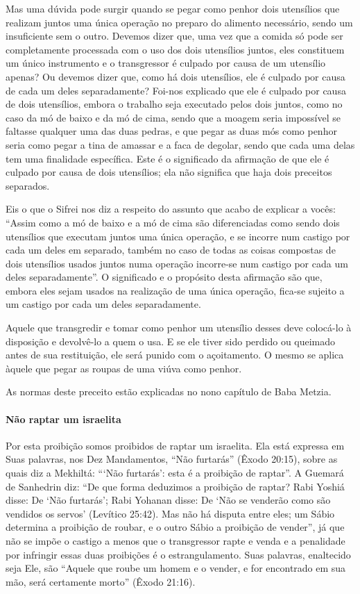 Mas uma dúvida pode surgir quando se pegar como penhor dois utensílios
que realizam juntos uma única operação no preparo do alimento
necessário, sendo um insuficiente sem o outro. Devemos dizer que, uma
vez que a comida só pode ser completamente processada com o uso dos
dois utensílios juntos, eles constituem um único instrumento e o
transgressor é culpado por causa de um utensílio apenas? Ou devemos
dizer que, como há dois utensílios, ele é culpado por causa de cada um
deles separadamente? Foi-nos explicado que ele é culpado por causa de
dois utensílios, embora o trabalho seja executado pelos dois juntos,
como no caso da mó de baixo e da mó de cima, sendo que a moagem seria
impossível se faltasse qualquer uma das duas pedras, e que pegar as
duas mós como penhor seria como pegar a tina de amassar e a faca de
degolar, sendo que cada uma delas tem uma finalidade específica. Este é
o significado da afirmação de que ele é culpado por causa de dois
utensílios; ela não significa que haja dois preceitos separados.

Eis o que o Sifrei nos diz a respeito do assunto que acabo de explicar
a vocês: ``Assim como a mó de baixo e a mó de cima são diferenciadas
como sendo dois utensílios que executam juntos uma única operação, e se
incorre num castigo por cada um deles em separado, também no caso de
todas as coisas compostas de dois utensílios usados juntos numa
operação incorre-se num castigo por cada um deles separadamente''. O
significado e o propósito desta afirmação são que, embora eles sejam
usados na realização de uma única operação, fica-se sujeito a um castigo
por cada um deles separadamente.

Aquele que transgredir e tomar como penhor um utensílio desses deve
colocá-lo à disposição e devolvê-lo a quem o usa. E se ele tiver sido
perdido ou queimado antes de sua restituição, ele será punido com o
açoitamento. O mesmo se aplica àquele que pegar as roupas de uma viúva
como penhor.

As normas deste preceito estão explicadas no nono capítulo de Baba Metzia.

\paragraph{Não raptar um israelita}

Por esta proibição somos proibidos de raptar um israelita. Ela está
expressa em Suas palavras, nos Dez Mandamentos, ``Não furtarás'' (Êxodo
20:15), sobre as quais diz a Mekhiltá: ```Não furtarás': esta é a
proibição de raptar''. A Guemará de Sanhedrin diz: ``De que forma
deduzimos a proibição de raptar? Rabi Yoshiá disse: De `Não furtarás';
Rabi Yohanan disse: De `Não se venderão como são vendidos os servos'
(Levítico 25:42). Mas não há disputa entre eles; um Sábio determina a
proibição de roubar, e o outro Sábio a proibição de vender'', já que
não se impõe o castigo a menos que o transgressor rapte e venda
e a penalidade por infringir essas duas proibições é o estrangulamento.
Suas palavras, enaltecido seja Ele, são ``Aquele que roube um homem e
o vender, e for encontrado em sua mão, será certamente morto'' (Êxodo 21:16).

